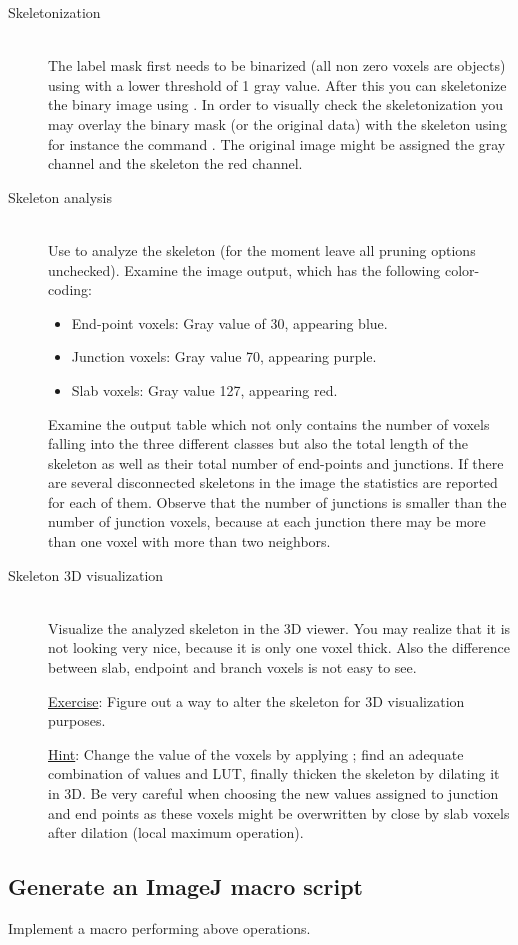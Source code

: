 \begin{description}
\item[Skeletonization]\hfill\\
The label mask first needs to be binarized (all non zero voxels are objects) using  with a lower threshold of 1 gray value. After this you can skeletonize the binary image using .  In order to visually check the skeletonization you may overlay the binary mask (or the original data) with the skeleton using for instance the command . The original image might be assigned the gray channel and the skeleton the red channel.
\item[Skeleton analysis]\hfill\\
Use  to analyze the skeleton (for the moment leave all pruning options unchecked). Examine the image output, which has the following color-coding:
\begin{itemize}
\item End-point voxels: Gray value of 30, appearing blue.
\item Junction voxels: Gray value 70, appearing purple.
\item Slab voxels: Gray value 127, appearing red.
\end{itemize}
Examine the output table which not only contains the number of voxels falling into the three different classes but also the total length of the skeleton as well as their total number of end-points and junctions. If there are several disconnected skeletons in the image the statistics are reported for each of them. Observe that the number of junctions is smaller than the number of junction voxels, because at each junction there may be more than one voxel with more than two neighbors.
\item[Skeleton 3D visualization]\hfill\\
Visualize the analyzed skeleton in the 3D viewer. You may realize that it is not looking very nice, because it is only one voxel thick. Also the difference between slab, endpoint and branch voxels is not easy to see. 

\underline{Exercise}: Figure out a way to alter the skeleton for 3D visualization purposes.

\underline{Hint}: Change the value of the voxels by applying ; find an adequate combination of values and LUT, finally thicken the skeleton by dilating it in 3D. Be very careful when choosing the new values assigned to junction and end points as these voxels might be overwritten by close by slab voxels after dilation (local maximum operation).
\end{description}

\subsection{Generate an ImageJ macro script}
Implement a macro performing above operations.

